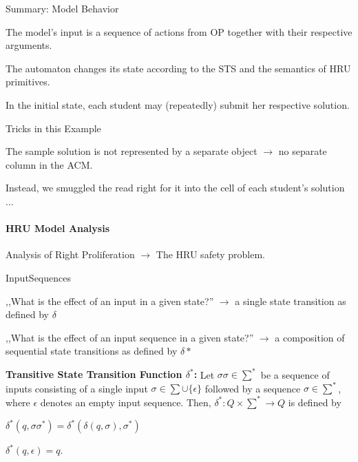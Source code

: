 \documentclass[a4paper]{article}
\renewcommand{\note}[2]{\begin{noteBox} \textbf{#1} #2 \end{noteBox}}
\begin{document}
\begin{multicols}{3}
    Summary: Model Behavior
    \begin{itemize*}
        \item The model’s input is a sequence of actions from OP together with their respective arguments.
        \item The automaton changes its state according to the STS and the semantics of HRU primitives.
        \item In the initial state, each student may (repeatedly) submit her respective solution.
    \end{itemize*}
    Tricks in this Example
    \begin{itemize*}
        \item The sample solution is not represented by a separate object $\rightarrow$ no separate column in the ACM.
        \item Instead, we smuggled the read right for it into the cell of each student’s solution ...
    \end{itemize*}

    \paragraph{HRU Model Analysis}
    Analysis of Right Proliferation $\rightarrow$  The HRU safety problem.

    InputSequences
    \begin{itemize*}
        \item ,,What is the effect of an input in a given state?'' $\rightarrow$  a single state transition as defined by $\delta$
        \item ,,What is the effect of an input sequence in a given state?'' $\rightarrow$  a composition of sequential state transitions as defined by $\delta*$
    \end{itemize*}

    \note{Transitive State Transition Function $\delta^*$:}{Let $\sigma\sigma\in\sum^*$ be a sequence of inputs consisting of a single input $\sigma\in\sum\cup\{\epsilon\}$ followed by a sequence $\sigma\in\sum^*$, where $\epsilon$ denotes an empty input sequence. Then, $\delta^*:Q\times\sum^*\rightarrow Q$ is defined by
        \begin{itemize*}
            \item $\delta^*(q,\sigma\sigma^*)=\delta^*(\delta(q,\sigma),\sigma^*)$
            \item $\delta^*(q,\epsilon)=q$.
        \end{itemize*}
    }


\end{multicols}
\end{document}
